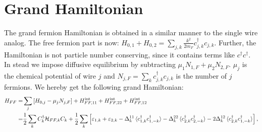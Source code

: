 \section{Grand Hamiltonian}
\label{sec.2wiresgrandHFF}
The grand fermion Hamiltonian is obtained in a similar manner to the single wire analog. The free fermion part is now: $H_{0,1}+H_{0,2} = \sum_{j,k}\frac{k^2}{2m_F}c^\dagger_{j,k}c_{j,k}$. Further, the Hamiltonian is not particle number conserving, since it contains terms like $c^\dagger c^\dagger$. In stead we impose diffusive equilibrium by subtracting $\mu_1N_{1,F}+\mu_2N_{2,F}$. $\mu_j$ is the chemical potential of wire $j$ and $N_{j,F} = \sum_k c^\dagger_{j,k}c_{j,k}$ is the number of $j$ fermions. We hereby get the following grand Hamiltonian:
\begin{align}
H_{FF} = &\sum_j \left[H_{0,j} - \mu_j N_{j,F}\right] + H^\text{int}_{FF,11} + H^\text{int}_{FF,22} + H^\text{int}_{FF,12} \nonumber \\
       = &\frac{1}{2}\sum_k C^\dagger_k \mathcal{H}_{FF,k}C_k + \frac{1}{2}\sum_k\left[\varepsilon_{1,k} + \varepsilon_{2,k} - \Delta^{11}_k\braket{c^\dagger_{1,k}c^\dagger_{1,-k}} - \Delta^{22}_k\braket{c^\dagger_{2,k}c^\dagger_{2,-k}} - 2\Delta^{12}_k\braket{c^\dagger_{2,k}c^\dagger_{1,-k}} \right], \nonumber
\end{align}

